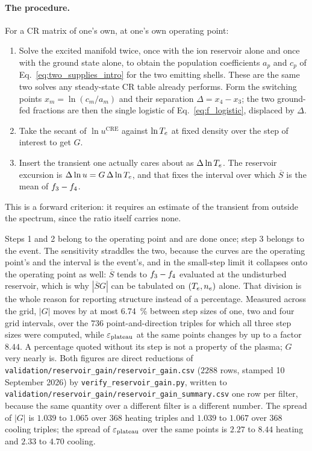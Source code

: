 \paragraph{The procedure.} For a CR matrix of one's own, at one's own operating
point:

\begin{enumerate}
\item Solve the excited manifold twice, once with the ion reservoir alone and
once with the ground state alone, to obtain the population coefficients $a_p$
and $c_p$ of Eq.~\eqref{eq:two_supplies_intro} for the two emitting shells.
These are the same two solves any steady-state CR table already performs. Form
the switching points $x_m = \ln(c_m/a_m)$ and their separation
$\Delta = x_4 - x_3$; the two ground-fed fractions are then the single logistic
of Eq.~\eqref{eq:f_logistic}, displaced by $\Delta$.
\item Take the secant of $\ln u^{\mathrm{CRE}}$ against $\ln T_e$ at fixed
density over the step of interest to get $G$.
\item Insert the transient one actually cares about as $\Delta\ln T_e$. The
reservoir excursion is $\Delta\ln u = G\,\Delta\ln T_e$, and that fixes the
interval over which $\overline{S}$ is the mean of $f_{3}-f_{4}$.
\end{enumerate}

\noindent This is a forward criterion: it requires an estimate of the transient
from outside the spectrum, since the ratio itself carries none.

Steps 1 and 2 belong to the operating point and are done once; step 3 belongs to
the event. The sensitivity straddles the two, because the curves are the
operating point's and the interval is the event's, and in the small-step limit
it collapses onto the operating point as well: $\overline{S}$ tends to
$f_{3}-f_{4}$ evaluated at the undisturbed reservoir, which is why
$|\overline{S}G|$ can be tabulated on $(T_e,n_e)$ alone. That division is the
whole reason for reporting structure instead of a percentage. Measured across
the grid, $|G|$ moves by at most \SI{6.74}{\percent}
between step sizes of one, two and four grid intervals, over the $736$
point-and-direction triples for which all three step sizes were computed, while
$\varepsilon_{\mathrm{plateau}}$ at the same points changes by up to a factor $8.44$. A percentage
quoted without its step is not a property of the plasma; $G$ very nearly is.
Both figures are direct reductions of
\texttt{validation/reservoir\_gain/reservoir\_gain.csv} ($2288$ rows, stamped
10 September 2026) by \texttt{verify\_reservoir\_gain.py}, written to
\texttt{validation/reservoir\_gain/reservoir\_gain\_summary.csv} one row per
filter, because the same quantity over a different filter is a different
number. The spread of $|G|$ is $1.039$ to
$1.065$ over $368$ heating triples and $1.039$ to $1.067$ over $368$ cooling
triples; the spread of $\varepsilon_{\mathrm{plateau}}$ over the same points is $2.27$ to $8.44$
heating and $2.33$ to $4.70$ cooling.

